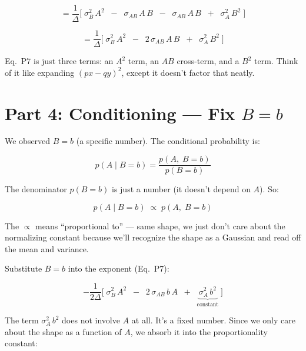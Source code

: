 \documentclass[11pt, a4paper]{article}
\newcommand{\gut}[1]{\begin{tcolorbox}[colback=lightyellow, colframe=orange!50, title=Gut feeling]#1\end{tcolorbox}}
\begin{document}
\begin{equation}
= \frac{1}{\Delta} \Big[ \;\sigma_B^2\, A^2 \;\;-\;\; \sigma_{AB}\, A\, B \;\;-\;\; \sigma_{AB}\, A\, B \;\;+\;\; \sigma_A^2\, B^2 \;\Big]
\tag{P6}
\end{equation}

\begin{equation}
= \frac{1}{\Delta} \Big[ \;\sigma_B^2\, A^2 \;\;-\;\; 2\,\sigma_{AB}\, A\, B \;\;+\;\; \sigma_A^2\, B^2 \;\Big]
\tag{P7}
\end{equation}

\gut{
Eq.~P7 is just three terms: an $A^2$ term, an $AB$ cross-term, and a $B^2$ term. Think of it like expanding $(px - qy)^2$, except it doesn't factor that neatly.
}


\section*{\color{secblue}Part 4: Conditioning --- Fix $B = b$}

We observed $B = b$ (a specific number). The conditional probability is:

\begin{equation}
p(A \mid B = b) = \frac{p(A,\; B = b)}{p(B = b)}
\tag{P8}
\end{equation}

The denominator $p(B = b)$ is just a number (it doesn't depend on $A$). So:

\begin{equation}
p(A \mid B = b) \;\propto\; p(A,\; B = b)
\tag{P9}
\end{equation}

The $\propto$ means ``proportional to'' --- same shape, we just don't care about the normalizing constant because we'll recognize the shape as a Gaussian and read off the mean and variance.

\bigskip
Substitute $B = b$ into the exponent (Eq.~P7):

\begin{equation}
-\frac{1}{2\Delta} \Big[ \;\sigma_B^2\, A^2 \;\;-\;\; 2\,\sigma_{AB}\, b\, A \;\;+\;\; \underbrace{\sigma_A^2\, b^2}_{\text{constant}} \;\Big]
\tag{P10}
\end{equation}

The term $\sigma_A^2\, b^2$ does not involve $A$ at all. It's a fixed number. Since we only care about the shape as a function of $A$, we absorb it into the proportionality constant:
\end{document}
